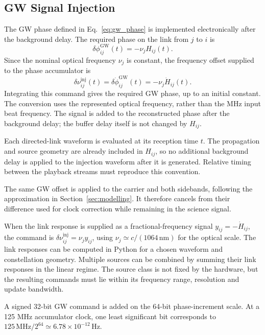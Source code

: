 \documentclass[aps,twocolumn,10pt,nofootinbib,floatfix]{revtex4-2}
\begin{document}
\subsection{GW Signal Injection}
\label{sec:gw_injection}
The GW phase defined in Eq.~\eqref{eq:gw_phase} is implemented electronically after the background delay. The required phase on the link from $j$ to $i$ is
\begin{equation*}
    \delta\phi^{\mathrm{GW}}_{ij}(t)=-\nu_jH_{ij}(t).
\end{equation*}
Since the nominal optical frequency $\nu_j$ is constant, the frequency offset supplied to the phase accumulator is
\begin{equation}\label{eq:gw_frequency_command}
    \delta\nu^{\mathrm{inj}}_{ij}(t)
    =\delta\dot\phi^{\mathrm{GW}}_{ij}(t)
    =-\nu_j\dot H_{ij}(t).
\end{equation}
Integrating this command gives the required GW phase, up to an initial constant. The conversion uses the represented optical frequency, rather than the MHz input beat frequency. The signal is added to the reconstructed phase after the background delay; the buffer delay itself is not changed by $H_{ij}$.

Each directed-link waveform is evaluated at its reception time $t$. The propagation and source geometry are already included in $H_{ij}$, so no additional background delay is applied to the injection waveform after it is generated. Relative timing between the playback streams must reproduce this convention.

The same GW offset is applied to the carrier and both sidebands, following the approximation in Section~\ref{sec:modelling}. It therefore cancels from their difference used for clock correction while remaining in the science signal.

When the link response is supplied as a fractional-frequency signal $y_{ij}=-\dot H_{ij}$, the command is $\delta\nu^{\mathrm{inj}}_{ij}=\nu_jy_{ij}$, using $\nu_j\simeq c/(1064\,\mathrm{nm})$ for the optical scale.
The link responses can be computed in Python for a chosen waveform and constellation geometry. Multiple sources can be combined by summing their link responses in the linear regime. The source class is not fixed by the hardware, but the resulting commands must lie within its frequency range, resolution and update bandwidth.

A signed 32-bit GW command is added on the 64-bit phase-increment scale. At a 125 MHz accumulator clock, one least significant bit corresponds to $125\,\mathrm{MHz}/2^{64}\simeq6.78\times10^{-12}\,\mathrm{Hz}$.
\end{document}
